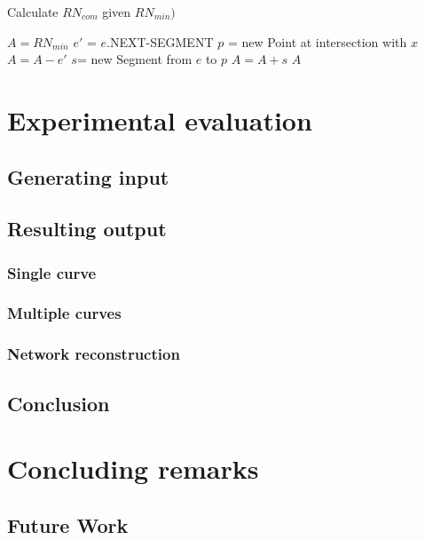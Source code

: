 \documentclass[11pt]{article}
\begin{document}
\begin{algorithm}
\caption{Calculate $RN_{com}$ given $RN_{min})$}
\begin{algorithmic} 
\STATE $A= RN_{min}$
\STATE $e'$ = $e$.NEXT-SEGMENT
\STATE $p$ = new Point at intersection with $x$
\STATE $A=A-e'$
\STATE $s$= new Segment from $e$ to $p$
\STATE $A=A+s$
\ENDIF
\ENDIF
\ENDIF
\ENDFOR
\RETURN $A$
\end{algorithmic}
\label{alg:RNcomalg}
\end{algorithm}

\section{Experimental evaluation}
\subsection{Generating input}


\subsection{Resulting output}
\subsubsection{Single curve}
\subsubsection{Multiple curves}
\subsubsection{Network reconstruction}

\subsection{Conclusion}

\section{Concluding remarks}


\subsection{Future Work}

\end{document}
